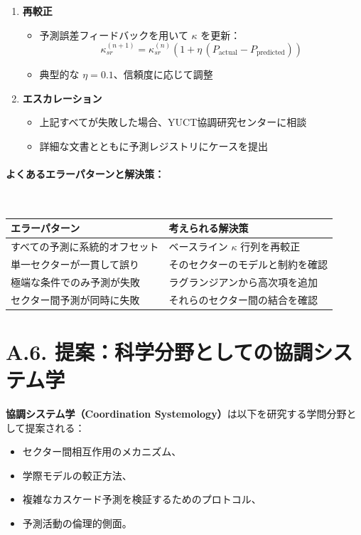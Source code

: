\documentclass[13pt,a4paper]{ltjsarticle}
\begin{document}
\begin{enumerate}
		\item \textbf{再較正}
		\begin{itemize}
			\item 予測誤差フィードバックを用いて $\kappa$ を更新：
			\[
			\kappa_{sr}^{(n+1)} = \kappa_{sr}^{(n)}\left(1+\eta\,(P_{\mathrm{actual}}-P_{\mathrm{predicted}})\right)
			\]
			\item 典型的な $\eta = 0.1$、信頼度に応じて調整
		\end{itemize}
		
		\item \textbf{エスカレーション}
		\begin{itemize}
			\item 上記すべてが失敗した場合、YUCT協調研究センターに相談
			\item 詳細な文書とともに予測レジストリにケースを提出
		\end{itemize}
	\end{enumerate}
	
	\paragraph*{よくあるエラーパターンと解決策：} \
	
	\begin{tabularx}{\textwidth}{|l|X|}
		\hline
		\textbf{エラーパターン} & \textbf{考えられる解決策} \\
		\hline
		すべての予測に系統的オフセット & ベースライン $\kappa$ 行列を再較正 \\
		\hline
		単一セクターが一貫して誤り & そのセクターのモデルと制約を確認 \\
		\hline
		極端な条件でのみ予測が失敗 & ラグランジアンから高次項を追加 \\
		\hline
		セクター間予測が同時に失敗 & それらのセクター間の結合を確認 \\
		\hline
	\end{tabularx}
	
	\section*{A.6. 提案：科学分野としての協調システム学}
	
	\textbf{協調システム学（Coordination Systemology）}は以下を研究する学問分野として提案される：
	\begin{itemize}[leftmargin=*]
		\item セクター間相互作用のメカニズム、
		\item 学際モデルの較正方法、
		\item 複雑なカスケード予測を検証するためのプロトコル、
		\item 予測活動の倫理的側面。
	\end{itemize}
	
\end{document}
